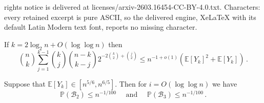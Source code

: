 \documentclass[10pt,a4paper]{amsart}
\newcommand{\E}{\mathbb{E}}
\newcommand{\PP}{\mathbb{P}}
\newcommand{\cB}{\mathcal{B}}
\begin{document}
rights notice is delivered at licenses/arxiv-2603.16454-CC-BY-4.0.txt. Characters: every retained excerpt is pure ASCII, so the delivered engine, XeLaTeX with its default Latin Modern text font, reports no missing character.
\begin{fact}\label{fact:Y-k-Delta}
    If $k = 2\log_2 n + O(\log \log n)$ then $$\binom{n}{k}\sum_{j = 1}^{k-1} \binom{k}{j}\binom{n-k}{k-j}2^{-2\binom{k}{2}+ \binom{j}{2}} \leq n^{-1 + o(1)}( \E [Y_k]^2 + \E [Y_k]) \,. $$
\end{fact}

\begin{lemma}\label{lem:large-covers}
    Suppose that $\E [Y_k] \in [n^{5/6},n^{6/5}]$.  Then for $i = O(\log\log n)$ we have 
    $$\PP(\cB_2 ) \leq  n^{-1/100}\quad \text{ and }\quad  \PP(\cB_3) \leq n^{-1/100}\,.$$
\end{lemma}
\end{document}

